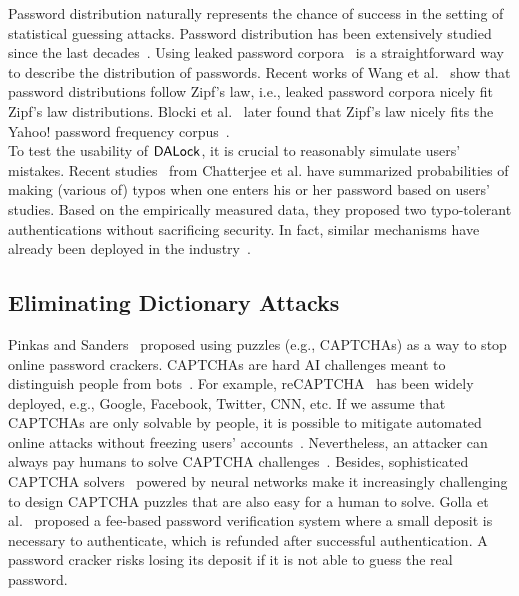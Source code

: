  Password distribution naturally represents the chance of success in the setting of statistical guessing attacks. Password distribution has been extensively studied since the last decades~\cite{FloHer:WWW07,DavKev:WWW12}. Using leaked password corpora~\cite{SP:Bonneau12,Dataset:RockYou,Dataset:LinkedIn} is a straightforward way to describe the distribution of passwords. Recent works of Wang et al.~\cite{EPRINT:WJHW14,TIFS17:WCWPXG,ESORICS:WanWan16} show that password distributions follow Zipf's law, i.e., leaked password corpora nicely fit Zipf's law distributions. Blocki et al.~\cite{SP:BloHarZho18} later found that Zipf's law nicely fits the Yahoo! password frequency corpus~\cite{SP:Bonneau12,NDSS:BloDatBon16}. \\

\vspace{-0.3cm}
  To test the usability of $\mathsf{DALock}$, it is crucial to reasonably simulate users' mistakes. Recent studies~\cite{CCS:CWPCR17,SP:CAAJR16} from Chatterjee et al. have summarized probabilities of making (various of) typos when one enters his or her password based on users' studies. Based on the empirically measured data, they proposed two typo-tolerant authentications without sacrificing security. In fact, similar mechanisms have already been deployed in the industry~\cite{News:FacebookCaseSensitiveNews,News:AmazonTypo}. 

\vspace{-0.15cm}
\subsection{Eliminating Dictionary Attacks} 

\vspace{-0.15cm}
 Pinkas and Sanders~\cite{CCS:PinSan02} proposed using puzzles (e.g., CAPTCHAs) as a way to stop online password crackers. CAPTCHAs are hard AI challenges meant to distinguish people from bots~\cite{EC:vBHL03}. For example, reCAPTCHA~\cite{von2008recaptcha} has been widely deployed, e.g., Google, Facebook, Twitter, CNN, etc. If we assume that CAPTCHAs are only solvable by people, it is possible to mitigate automated online attacks without freezing users' accounts~\cite{SP:BBFNJ10,CCS:BurMarMit11}. Nevertheless, an attacker can always pay humans to solve CAPTCHA challenges~\cite{captchaSolver}. Besides, sophisticated CAPTCHA solvers~\cite{NDSS:GYCZLT16,CCS:YTFZFX18} powered by neural networks make it increasingly challenging to design CAPTCHA puzzles that are also easy for a human to solve.  Golla et al.~\cite{SOUPS:GBD17} proposed a fee-based password verification system where a small deposit is necessary to authenticate, which is refunded after successful authentication. A password cracker risks losing its deposit if it is not able to guess the real password.  

